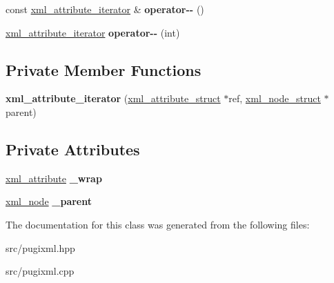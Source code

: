\begin{DoxyCompactItemize}
\item 
\mbox{\label{classpugi_1_1xml__attribute__iterator_a7ac06eb61d47a9e57bcd0fd2434c6243}} 
const \hyperlink{classpugi_1_1xml__attribute__iterator}{xml\+\_\+attribute\+\_\+iterator} \& {\bfseries operator-\/-\/} ()
\item 
\mbox{\label{classpugi_1_1xml__attribute__iterator_a48737f6e77abe7fa3e80841597dc93e1}} 
\hyperlink{classpugi_1_1xml__attribute__iterator}{xml\+\_\+attribute\+\_\+iterator} {\bfseries operator-\/-\/} (int)
\end{DoxyCompactItemize}
\subsection*{Private Member Functions}
\begin{DoxyCompactItemize}
\item 
\mbox{\label{classpugi_1_1xml__attribute__iterator_a3f3ae3fe5c21647042c347e1a6257b73}} 
{\bfseries xml\+\_\+attribute\+\_\+iterator} (\hyperlink{structpugi_1_1xml__attribute__struct}{xml\+\_\+attribute\+\_\+struct} $\ast$ref, \hyperlink{structpugi_1_1xml__node__struct}{xml\+\_\+node\+\_\+struct} $\ast$parent)
\end{DoxyCompactItemize}
\subsection*{Private Attributes}
\begin{DoxyCompactItemize}
\item 
\mbox{\label{classpugi_1_1xml__attribute__iterator_a3985d6107023a7eae2ec4acdcd710809}} 
\hyperlink{classpugi_1_1xml__attribute}{xml\+\_\+attribute} {\bfseries \+\_\+wrap}
\item 
\mbox{\label{classpugi_1_1xml__attribute__iterator_a2cc75b518f6533d7b97d820613b8a3be}} 
\hyperlink{classpugi_1_1xml__node}{xml\+\_\+node} {\bfseries \+\_\+parent}
\end{DoxyCompactItemize}


The documentation for this class was generated from the following files\+:\begin{DoxyCompactItemize}
\item 
src/pugixml.\+hpp\item 
src/pugixml.\+cpp\end{DoxyCompactItemize}
